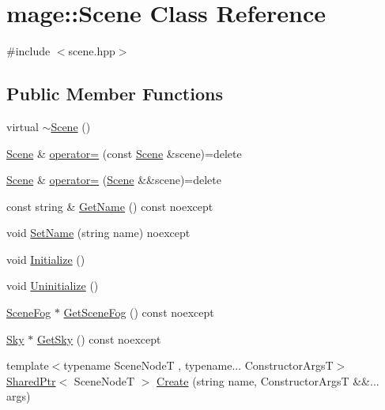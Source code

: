 \hypertarget{classmage_1_1_scene}{}\section{mage\+:\+:Scene Class Reference}
\label{classmage_1_1_scene}


{\ttfamily \#include $<$scene.\+hpp$>$}

\subsection*{Public Member Functions}
\begin{DoxyCompactItemize}
\item 
virtual \hyperlink{classmage_1_1_scene_adc40910fdca62586659c2961fe7e7f3c}{$\sim$\+Scene} ()
\item 
\hyperlink{classmage_1_1_scene}{Scene} \& \hyperlink{classmage_1_1_scene_a2c25c0fedc0230771d8c00a8288a69ce}{operator=} (const \hyperlink{classmage_1_1_scene}{Scene} \&scene)=delete
\item 
\hyperlink{classmage_1_1_scene}{Scene} \& \hyperlink{classmage_1_1_scene_a400926762670c9cd9b6d456291600f53}{operator=} (\hyperlink{classmage_1_1_scene}{Scene} \&\&scene)=delete
\item 
const string \& \hyperlink{classmage_1_1_scene_a6afd25c30d08eb579eb430af49cf8fc0}{Get\+Name} () const noexcept
\item 
void \hyperlink{classmage_1_1_scene_ae5e0a4daa62322ff18d673944ad4e0e8}{Set\+Name} (string name) noexcept
\item 
void \hyperlink{classmage_1_1_scene_a3cd12ef381ca743bf0b8f8aa2a76eb57}{Initialize} ()
\item 
void \hyperlink{classmage_1_1_scene_a714dc33c04dc2b8e2cec93564905b174}{Uninitialize} ()
\item 
\hyperlink{classmage_1_1_scene_fog}{Scene\+Fog} $\ast$ \hyperlink{classmage_1_1_scene_a1f21d92feb659477ceb4642322fa2f0c}{Get\+Scene\+Fog} () const noexcept
\item 
\hyperlink{classmage_1_1_sky}{Sky} $\ast$ \hyperlink{classmage_1_1_scene_afecf68ec8c48d4c28082f99d8042e700}{Get\+Sky} () const noexcept
\item 
{\footnotesize template$<$typename Scene\+NodeT , typename... Constructor\+ArgsT$>$ }\\\hyperlink{namespacemage_a1e01ae66713838a7a67d30e44c67703e}{Shared\+Ptr}$<$ Scene\+NodeT $>$ \hyperlink{classmage_1_1_scene_a9a46c7e0624aec7b5aa2f0ba77b55386}{Create} (string name, Constructor\+ArgsT \&\&... args)

\end{DoxyCompactItemize}
